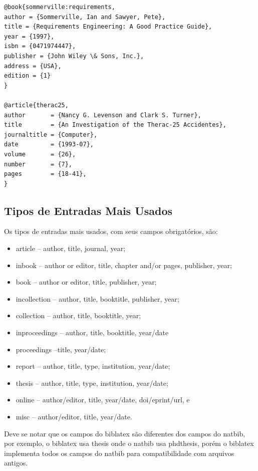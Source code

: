 
\begin{lstlisting}[caption=Exemplo de arquivo .bib,label=fig:bibfile]
@book{sommerville:requirements,
author = {Sommerville, Ian and Sawyer, Pete},
title = {Requirements Engineering: A Good Practice Guide},
year = {1997},
isbn = {0471974447},
publisher = {John Wiley \& Sons, Inc.},
address = {USA},
edition = {1}
}

@article{therac25,
author       = {Nancy G. Levenson and Clark S. Turner},
title        = {An Investigation of the Therac-25 Accidentes},
journaltitle = {Computer},
date         = {1993-07},
volume       = {26},
number       = {7},
pages        = {18-41},
}
\end{lstlisting}



\subsection{Tipos de Entradas Mais Usados}

Os tipos de entradas mais usados, com seus campos obrigatórios, são\parencite{Kime:2019}:
\begin{itemize}
    \item article -- author, title, journal, year;
    \item inbook -- author or editor, title, chapter and/or pages, publisher, year;
    \item book -- author or editor, title, publisher, year;
    \item incollection -- author, title, booktitle, publisher, year;
    \item collection -- author, title, booktitle, year;
    \item inproceedings -- author, title, booktitle, year/date
    \item proceedings --title, year/date;
    \item report -- author, title, type, institution, year/date;
    \item thesis --  author, title, type, institution, year/date;
    \item online -- author/editor, title, year/date, doi/eprint/url, e
    \item misc -- author/editor, title, year/date.
\end{itemize}

Deve se notar que os campos do biblatex são diferentes dos campos do natbib, por exemplo, o biblatex usa thesis onde o natbib usa phdthesis, porém o biblatex implementa todos os campos do natbib para compatibilidade com
arquivos antigos.


